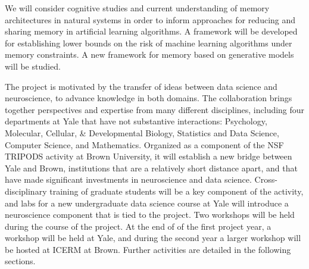 We will consider cognitive studies and
current understanding of memory architectures in natural systems
in order to inform approaches for reducing and sharing memory in
artificial learning algorithms. A framework will be developed for
establishing lower bounds on the risk of machine learning algorithms under
memory constraints. A new framework for memory based on generative models
will be studied.
\vskip5pt

The project is motivated by the transfer of ideas between data science
and neuroscience, to advance knowledge in both domains. The
collaboration brings together perspectives and expertise from many
different disciplines, including four departments at Yale that have
not substantive interactions: Psychology, Molecular, Cellular, \&
Developmental Biology, Statistics and Data Science, Computer Science, and
Mathematics. Organized as a component of the NSF TRIPODS activity at
Brown University, it will establish a new bridge between Yale and
Brown, institutions that are a relatively short distance apart, and
that have made significant investments in neuroscience and data
science. Cross-disciplinary training of graduate students will be a
key component of the activity, and labs for a new undergraduate data
science course at Yale will introduce a neuroscience component that is
tied to the project.  Two workshops will be held during the course of
the project. At the end of of the first project year, a workshop will
be held at Yale, and during the second year a larger workshop will be
hosted at ICERM at Brown. Further activities are detailed in the
following sections.




